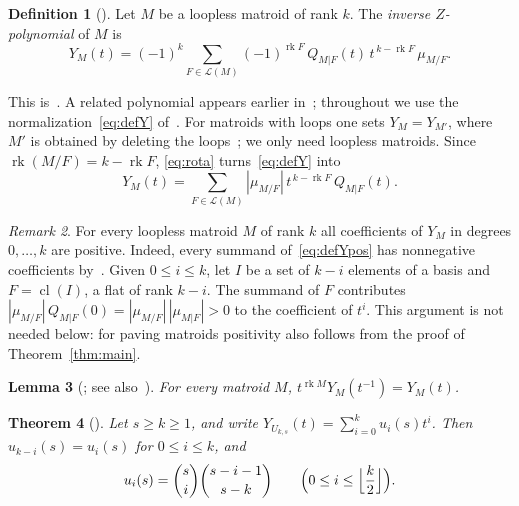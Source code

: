 \documentclass[11pt]{amsart}
\newtheorem{theorem}{Theorem}[section]
\newtheorem{lemma}[theorem]{Lemma}
\theoremstyle{definition}
\newtheorem{definition}[theorem]{Definition}
\theoremstyle{remark}
\newtheorem{remark}[theorem]{Remark}
\numberwithin{equation}{section}
\DeclareMathOperator{\rk}{rk}
\DeclareMathOperator{\cl}{cl}
\newcommand{\cL}{\mathcal{L}}
\begin{document}
\begin{definition}[\cite{GRX}]\label{def:Y}
Let $M$ be a loopless matroid of rank $k$. The \emph{inverse $Z$-polynomial} of $M$ is
\begin{equation}\label{eq:defY}
Y_M(t)=(-1)^{k}\sum_{F\in\cL(M)}(-1)^{\rk F}\,Q_{M|F}(t)\,t^{\,k-\rk F}\,\mu_{M/F}.
\end{equation}
\end{definition}

This is~\cite[equations~(2) and~(3)]{GRX}. A related polynomial appears earlier in~\cite[p.~19, footnote~7]{FMSV}; throughout we use the normalization~\eqref{eq:defY} of~\cite{GRX}. For matroids with loops one sets $Y_M=Y_{M'}$, where $M'$ is obtained by deleting the loops~\cite{GRX}; we only need loopless matroids. Since $\rk(M/F)=k-\rk F$, \eqref{eq:rota} turns~\eqref{eq:defY} into
\begin{equation}\label{eq:defYpos}
Y_M(t)=\sum_{F\in\cL(M)}|\mu_{M/F}|\,t^{\,k-\rk F}\,Q_{M|F}(t).
\end{equation}

\begin{remark}\label{rem:positivity}
For every loopless matroid $M$ of rank $k$ all coefficients of $Y_M$ in degrees $0,\dots,k$ are positive. Indeed, every summand of~\eqref{eq:defYpos} has nonnegative coefficients by~\cite{BHMPW}. Given $0\le i\le k$, let $I$ be a set of $k-i$ elements of a basis and $F=\cl(I)$, a flat of rank $k-i$. The summand of $F$ contributes $|\mu_{M/F}|\,Q_{M|F}(0)=|\mu_{M/F}|\,|\mu_{M|F}|>0$ to the coefficient of $t^i$. This argument is not needed below: for paving matroids positivity also follows from the proof of Theorem~\ref{thm:main}.
\end{remark}

\begin{lemma}[{\cite[Lemma~2.2]{GRX}; see also~\cite[p.~5]{BHMPW}}]\label{lem:palindromic}
For every matroid $M$, $t^{\rk M}Y_M(t^{-1})=Y_M(t)$.
\end{lemma}

\begin{theorem}[{\cite[Theorem~1.1]{GRX}}]\label{thm:uniform}
Let $s\ge k\ge1$, and write $Y_{U_{k,s}}(t)=\sum_{i=0}^k u_i(s)t^i$. Then $u_{k-i}(s)=u_i(s)$ for $0\le i\le k$, and
\begin{equation}\label{eq:uniform}
u_i(s)=\binom{s}{i}\binom{s-i-1}{s-k}\qquad\Bigl(0\le i\le\Bigl\lfloor\frac k2\Bigr\rfloor\Bigr).
\end{equation}
\end{theorem}
\end{document}
